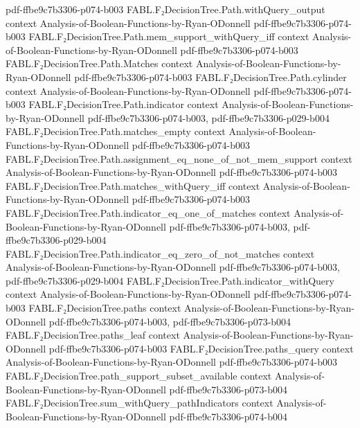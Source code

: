 \begin{theorem}
  {pdf-ffbe9c7b3306-p074-b003}
\proofstep
  {FABL.F₂DecisionTree.Path.withQuery_output}
  {context}
  {Analysis-of-Boolean-Functions-by-Ryan-ODonnell}
  {pdf-ffbe9c7b3306-p074-b003}
\proofstep
  {FABL.F₂DecisionTree.Path.mem_support_withQuery_iff}
  {context}
  {Analysis-of-Boolean-Functions-by-Ryan-ODonnell}
  {pdf-ffbe9c7b3306-p074-b003}
\proofstep
  {FABL.F₂DecisionTree.Path.Matches}
  {context}
  {Analysis-of-Boolean-Functions-by-Ryan-ODonnell}
  {pdf-ffbe9c7b3306-p074-b003}
\proofstep
  {FABL.F₂DecisionTree.Path.cylinder}
  {context}
  {Analysis-of-Boolean-Functions-by-Ryan-ODonnell}
  {pdf-ffbe9c7b3306-p074-b003}
\proofstep
  {FABL.F₂DecisionTree.Path.indicator}
  {context}
  {Analysis-of-Boolean-Functions-by-Ryan-ODonnell}
  {pdf-ffbe9c7b3306-p074-b003,
    pdf-ffbe9c7b3306-p029-b004}
\proofstep
  {FABL.F₂DecisionTree.Path.matches_empty}
  {context}
  {Analysis-of-Boolean-Functions-by-Ryan-ODonnell}
  {pdf-ffbe9c7b3306-p074-b003}
\proofstep
  {FABL.F₂DecisionTree.Path.assignment_eq_none_of_not_mem_support}
  {context}
  {Analysis-of-Boolean-Functions-by-Ryan-ODonnell}
  {pdf-ffbe9c7b3306-p074-b003}
\proofstep
  {FABL.F₂DecisionTree.Path.matches_withQuery_iff}
  {context}
  {Analysis-of-Boolean-Functions-by-Ryan-ODonnell}
  {pdf-ffbe9c7b3306-p074-b003}
\proofstep
  {FABL.F₂DecisionTree.Path.indicator_eq_one_of_matches}
  {context}
  {Analysis-of-Boolean-Functions-by-Ryan-ODonnell}
  {pdf-ffbe9c7b3306-p074-b003,
    pdf-ffbe9c7b3306-p029-b004}
\proofstep
  {FABL.F₂DecisionTree.Path.indicator_eq_zero_of_not_matches}
  {context}
  {Analysis-of-Boolean-Functions-by-Ryan-ODonnell}
  {pdf-ffbe9c7b3306-p074-b003,
    pdf-ffbe9c7b3306-p029-b004}
\proofstep
  {FABL.F₂DecisionTree.Path.indicator_withQuery}
  {context}
  {Analysis-of-Boolean-Functions-by-Ryan-ODonnell}
  {pdf-ffbe9c7b3306-p074-b003}
\proofstep
  {FABL.F₂DecisionTree.paths}
  {context}
  {Analysis-of-Boolean-Functions-by-Ryan-ODonnell}
  {pdf-ffbe9c7b3306-p074-b003,
    pdf-ffbe9c7b3306-p073-b004}
\proofstep
  {FABL.F₂DecisionTree.paths_leaf}
  {context}
  {Analysis-of-Boolean-Functions-by-Ryan-ODonnell}
  {pdf-ffbe9c7b3306-p074-b003}
\proofstep
  {FABL.F₂DecisionTree.paths_query}
  {context}
  {Analysis-of-Boolean-Functions-by-Ryan-ODonnell}
  {pdf-ffbe9c7b3306-p074-b003}
\proofstep
  {FABL.F₂DecisionTree.path_support_subset_available}
  {context}
  {Analysis-of-Boolean-Functions-by-Ryan-ODonnell}
  {pdf-ffbe9c7b3306-p073-b004}
\proofstep
  {FABL.F₂DecisionTree.sum_withQuery_pathIndicators}
  {context}
  {Analysis-of-Boolean-Functions-by-Ryan-ODonnell}
  {pdf-ffbe9c7b3306-p074-b004}
\proofstep

\end{theorem}

